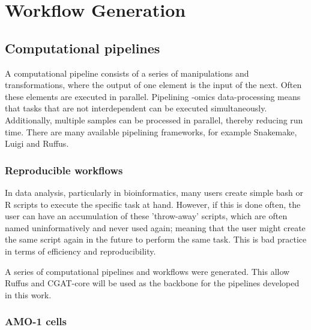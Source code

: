 \chapter{\label{ch:4-Pipelines}Workflow Generation}


\section{Computational pipelines}
A computational pipeline consists of a series of manipulations and transformations, where the output of one element is the input of the next.
Often these elements are executed in parallel.
Pipelining -omics data-processing means that tasks that are not interdependent can be executed simultaneously.
Additionally, multiple samples can be processed in parallel, thereby reducing run time.
There are many available pipelining frameworks, for example Snakemake, Luigi and Ruffus\cite{goodstadt2010ruffus}.

\subsection{Reproducible workflows}
In data analysis, particularly in bioinformatics, many users create simple bash or R scripts to execute the specific task at hand.
However, if this is done often, the user can have an accumulation of these 'throw-away' scripts, which are often named uninformatively and never used again; meaning that the user might create the same script again in the future to perform the same task.
This is bad practice in terms of efficiency and reproducibility.

A series of computational pipelines and workflows were generated. This allow
Ruffus and CGAT-core\cite{cribbs2019cgat} will be used as the backbone for the pipelines developed in this work.

\subsection{AMO-1 cells}
